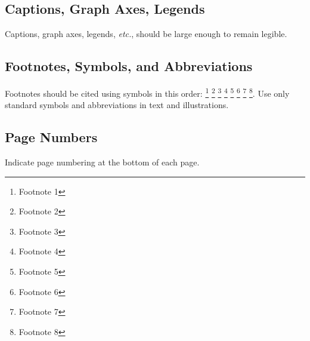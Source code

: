 \documentclass[]{iac}
\begin{document}
\subsection{Captions, Graph Axes, Legends}
Captions, graph axes, legends, \textit{etc.}, should be large enough to remain legible.

\subsection{Footnotes, Symbols, and Abbreviations}
Footnotes should be cited using symbols in this order: \footnote{Footnote 1} \footnote{Footnote 2} \footnote{Footnote 3} \footnote{Footnote 4} \footnote{Footnote 5} \footnote{Footnote 6} \footnote{Footnote 7} \footnote{Footnote 8}. Use only standard symbols and abbreviations in text and illustrations.

\subsection{Page Numbers}
Indicate page numbering at the bottom of each page.

 

\end{document}
